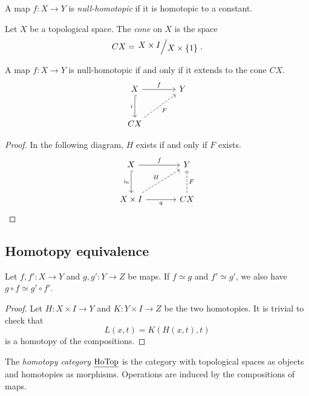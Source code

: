 
\begin{definicija}
A map $f \colon X \to Y$ is
\emph{null-homotopic} if it is homotopic to a
constant.
\end{definicija}

\begin{definicija}
Let $X$ be a topological space. The \emph{cone} on $X$
is the space
\[
CX = \kvoc{X \times I}{X \times \set{1}}.
\]
\end{definicija}

\begin{trditev}
A map $f \colon X \to Y$ is null-homotopic if and only if it
extends to the cone $CX$.
\[
\begin{tikzcd}[column sep=large, row sep=large]
X \arrow[r, "f"] \arrow[d, hook, "i"'] & Y \\
CX \arrow[ur, dashed, "F"']
\end{tikzcd}
\]
\end{trditev}

\begin{proof}
In the following diagram, $H$ exists if and only if $F$ exists.
\[
\begin{tikzcd}[column sep=large, row sep=large]
X \arrow[r, "f"] \arrow[d, hook, "i_0"'] & Y \\
X \times I \arrow[ur, dashed, "H"] \arrow[r, "q"']
&
CX \arrow[u, dashed, "F"']
\end{tikzcd} \qedhere
\]
\end{proof}

\newpage

\subsection{Homotopy equivalence}

\begin{trditev}
Let $f, f' \colon X \to Y$ and $g, g' \colon Y \to Z$ be maps. If
$f \simeq g$ and $f' \simeq g'$, we also have
$g \circ f \simeq g' \circ f'$.
\end{trditev}

\begin{proof}
Let $H \colon X \times I \to Y$ and $K \colon Y \times I \to Z$ be
the two homotopies. It is trivial to check that
\[
L(x, t) = K(H(x, t), t)
\]
is a homotopy of the compositions.
\end{proof}

\begin{definicija}
The \emph{homotopy category}
$\underline{\operatorname{HoTop}}$ is the category with topological spaces as objects
and homotopies as morphisms. Operations are induced by the
compositions of maps.
\end{definicija}

